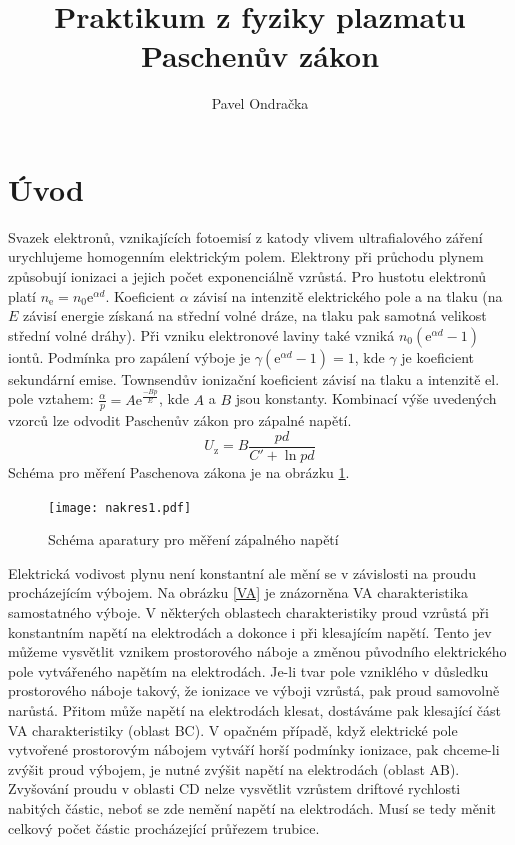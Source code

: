 \documentclass[12pt]{article}
\begin{document}
\title{Praktikum z fyziky plazmatu \\
Paschenův zákon}
\author{Pavel Ondračka}
\maketitle

\section{Úvod}
Svazek elektronů, vznikajících fotoemisí z katody vlivem ultrafialového záření urychlujeme homogenním elektrickým polem. Elektrony při průchodu plynem způsobují ionizaci a jejich počet exponenciálně vzrůstá. Pro hustotu elektronů platí $n_\mathrm{e}=n_0 \mathrm{e}^{\alpha d}$.
Koeficient $\alpha$ závisí na intenzitě elektrického pole a na tlaku (na $E$ závisí energie získaná na střední volné dráze, na tlaku pak samotná velikost střední volné dráhy). Při vzniku elektronové laviny také vzniká $n_0 (\mathrm{e}^{\alpha d} - 1)$ iontů. Podmínka pro zapálení výboje je $\gamma (\mathrm{e}^{\alpha d} - 1)=1$, kde $\gamma$ je koeficient sekundární emise. 
Townsendův ionizační koeficient závisí na tlaku a intenzitě el. pole vztahem: $\frac{\alpha}{p} = A \mathrm{e}^{\frac{-B p}{E}}$,
kde $A$ a $B$ jsou konstanty. Kombinací výše uvedených vzorců lze odvodit Paschenův zákon pro zápalné napětí.
\begin{equation}
U_\mathrm{z} = B \frac{pd}{C' + \ln{pd}}
\end{equation}
Schéma pro měření Paschenova zákona je na obrázku \ref{schema1}.

\begin{figure}[htbp]
\begin{center}
\texttt{[image: nakres1.pdf]}
\caption{Schéma aparatury pro měření zápalného napětí}
\end{center}
\label{schema1}
\end{figure}

Elektrická vodivost plynu není konstantní ale mění se v závislosti na proudu procházejícím výbojem.
Na obrázku \ref{VA} je znázorněna VA charakteristika samostatného výboje. V některých oblastech charakteristiky proud vzrůstá při konstantním napětí na elektrodách a dokonce i při klesajícím napětí. Tento jev můžeme vysvětlit vznikem prostorového náboje a změnou původního elektrického pole vytvářeného napětím na elektrodách. Je-li tvar pole vzniklého v důsledku prostorového náboje takový, že ionizace ve výboji vzrůstá, pak proud samovolně narůstá. Přitom může napětí na elektrodách klesat, dostáváme pak klesající část VA charakteristiky (oblast BC). V opačném případě, když elektrické pole vytvořené prostorovým nábojem vytváří horší podmínky ionizace, pak chceme-li zvýšit proud výbojem, je nutné zvýšit napětí na elektrodách (oblast AB). Zvyšování proudu v oblasti CD nelze vysvětlit vzrůstem driftové rychlosti nabitých částic, neboť se zde nemění napětí na elektrodách. Musí se tedy měnit celkový počet částic procházející průřezem trubice.
\end{document}
